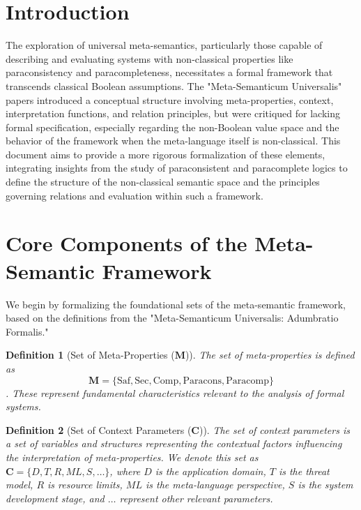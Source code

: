 \documentclass{article}
\newcommand{\MetaProps}{\mathbf{M}}
\newcommand{\ContextParams}{\mathbf{C}}
\newcommand{\Saf}{\text{Saf}}
\newcommand{\Sec}{\text{Sec}}
\newcommand{\Comp}{\text{Comp}}
\newcommand{\Paracons}{\text{Paracons}}
\newcommand{\Paracomp}{\text{Paracomp}}
\newtheorem{definition}{Definition}[section] %
\begin{document}
	\section{Introduction}
	The exploration of universal meta-semantics, particularly those capable of describing and evaluating systems with non-classical properties like paraconsistency and paracompleteness, necessitates a formal framework that transcends classical Boolean assumptions. The "Meta-Semanticum Universalis" papers introduced a conceptual structure involving meta-properties, context, interpretation functions, and relation principles, but were critiqued for lacking formal specification, especially regarding the non-Boolean value space and the behavior of the framework when the meta-language itself is non-classical. This document aims to provide a more rigorous formalization of these elements, integrating insights from the study of paraconsistent and paracomplete logics to define the structure of the non-classical semantic space and the principles governing relations and evaluation within such a framework.
	
	\section{Core Components of the Meta-Semantic Framework}
	
	We begin by formalizing the foundational sets of the meta-semantic framework, based on the definitions from the "Meta-Semanticum Universalis: Adumbratio Formalis."
	
	\begin{definition}[Set of Meta-Properties ($\MetaProps$)]
		The set of meta-properties is defined as $$\MetaProps = \{ \Saf, \Sec, \Comp, \Paracons, \Paracomp \}$$. These represent fundamental characteristics relevant to the analysis of formal systems.
	\end{definition}
	
	\begin{definition}[Set of Context Parameters ($\ContextParams$)]
		The set of context parameters is a set of variables and structures representing the contextual factors influencing the interpretation of meta-properties. We denote this set as $\ContextParams = \{ D, T, R, ML, S, \dots \}$, where $D$ is the application domain, $T$ is the threat model, $R$ is resource limits, $ML$ is the meta-language perspective, $S$ is the system development stage, and $\dots$ represent other relevant parameters.
	\end{definition}
	
\end{document}
